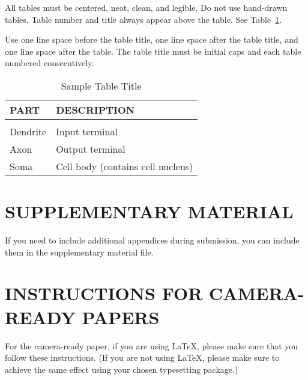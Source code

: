 \documentclass[twoside]{article} \usepackage{aistats2017}
\begin{document}
All tables must be centered, neat, clean, and legible. Do not use hand-drawn tables. Table number and title always appear above the table.
See Table~\ref{sample-table}.

Use one line space before the table title, one line space after the table title, and one line space after the table. The table title must be
initial caps and each table numbered consecutively.

\begin{table}[h]
\caption{Sample Table Title} \label{sample-table}
\begin{center}
\begin{tabular}{ll}
{\bf PART}  &{\bf DESCRIPTION} \\
\hline \\
Dendrite         &Input terminal \\
Axon             &Output terminal \\
Soma             &Cell body (contains cell nucleus) \\
\end{tabular}
\end{center}
\end{table}

\section{SUPPLEMENTARY MATERIAL}

If you need to include additional appendices during submission, you
can include them in the supplementary material file.


\newpage

\section{INSTRUCTIONS FOR CAMERA-READY PAPERS}

For the camera-ready paper, if you are using \LaTeX, please make sure
that you follow these instructions.  (If you are not using \LaTeX,
please make sure to achieve the same effect using your chosen
typesetting package.)
\end{document}
